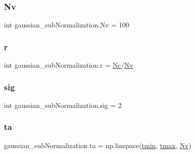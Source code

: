 \subsubsection{\texorpdfstring{Nv}{Nv}}
{\footnotesize\ttfamily int gaussian\+\_\+sub\+Normalization.\+Nv = 100}

\mbox{\label{namespacegaussian__subNormalization_aad8a705b42cc4c460f49df4eaee2b4aa}} 
\subsubsection{\texorpdfstring{r}{r}}
{\footnotesize\ttfamily int gaussian\+\_\+sub\+Normalization.\+r = \hyperlink{namespacegaussian__subNormalization_ad429c93e85cb6578d1b39cad48499521}{Nc}/\hyperlink{namespacegaussian__subNormalization_a2102558c499f529f1ef90c72aad83eb6}{Nv}}

\mbox{\label{namespacegaussian__subNormalization_ab1fe9cd4fd57a3a2c62f71c59a177f8c}} 
\subsubsection{\texorpdfstring{sig}{sig}}
{\footnotesize\ttfamily int gaussian\+\_\+sub\+Normalization.\+sig = 2}

\mbox{\label{namespacegaussian__subNormalization_a6678635cf14e1f6b9315c0ffc30a72e2}} 
\subsubsection{\texorpdfstring{ta}{ta}}
{\footnotesize\ttfamily gaussian\+\_\+sub\+Normalization.\+ta = np.\+linspace(\hyperlink{namespacegaussian__subNormalization_a12be11a804f6eb95c81b49bf77ac4cf9}{tmin}, \hyperlink{namespacegaussian__subNormalization_a4891507f9d29791fe1a3168ae9e3643e}{tmax}, \hyperlink{namespacegaussian__subNormalization_a2102558c499f529f1ef90c72aad83eb6}{Nv})}

